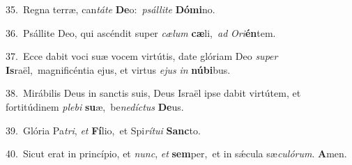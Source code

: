 {\numbfont\textcolor{\numbcolor}{35.}}~Regna terræ, can\-\textit{tá}\-\textit{te} \textbf{De}\-o:~\star \textit{psál}\-\textit{li}\textit{te} \textbf{Dó}\-\textbf{mi}no.\par
{\numbfont\textcolor{\numbcolor}{36.}}~Psállite Deo, qui ascéndit super \textit{cæ}\-\textit{lum} \textbf{cæ}\-li,~\star \textit{ad} \textit{O}\-\textit{ri}\textbf{én}tem.\par
{\numbfont\textcolor{\numbcolor}{37.}}~Ecce dabit voci suæ vocem virtútis, date glóriam Deo \textit{su}\-\textit{per} \textbf{Is}\-raël,~\star magnificéntia ejus, et virtus \textit{e}\-\textit{jus} \textit{in} \textbf{nú}\-\textbf{bi}bus.\par
{\numbfont\textcolor{\numbcolor}{38.}}~Mirábilis Deus in sanctis suis, Deus Israël ipse dabit virtútem, et fortitúdinem \textit{ple}\-\textit{bi} \textbf{su}\-æ,~\star be\-\textit{ne}\-\textit{díc}\textit{tus} \textbf{De}\-us.\par
{\numbfont\textcolor{\numbcolor}{39.}}~Glória Pa\-\textit{tri}\-, \textit{et} \textbf{Fí}\-lio,~\star et Spi\-\textit{rí}\-\textit{tu}\textit{i} \textbf{Sanc}\-to.\par
{\numbfont\textcolor{\numbcolor}{40.}}~Sicut erat in princípio, et \textit{nunc}\-, \textit{et} \textbf{sem}\-per,~\star et in sǽcula sæ\-\textit{cu}\-\textit{ló}\textit{rum}. \textbf{A}\-men.\par
